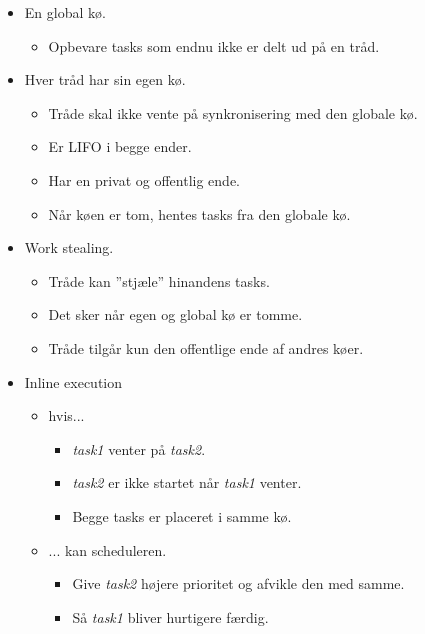 \begin{itemize}
	\item En global kø.
	\begin{itemize}
		\item Opbevare tasks som endnu ikke er delt ud på en tråd.
	\end{itemize}
	\item Hver tråd har sin egen kø.
	\begin{itemize}
		\item Tråde skal ikke vente på synkronisering med den globale kø.
		\item Er LIFO i begge ender.
		\item Har en privat og offentlig ende.
		\item Når køen er tom, hentes tasks fra den globale kø.
	\end{itemize}
	\item Work stealing.
	\begin{itemize}
		\item Tråde kan ''stjæle'' hinandens tasks.
		\item Det sker når egen og global kø er tomme.
		\item Tråde tilgår kun den offentlige ende af andres køer.
	\end{itemize}
	\item Inline execution
	\begin{itemize}
		\item hvis...
		\begin{itemize}
			\item \textit{task1} venter på \textit{task2}.
			\item \textit{task2} er ikke startet når \textit{task1} venter.
			\item Begge tasks er placeret i samme kø.
		\end{itemize}
		\item ... kan scheduleren.
		\begin{itemize}
			\item Give \textit{task2} højere prioritet og afvikle den med samme.
			\item Så \textit{task1} bliver hurtigere færdig.
		\end{itemize}
	\end{itemize}
\end{itemize}